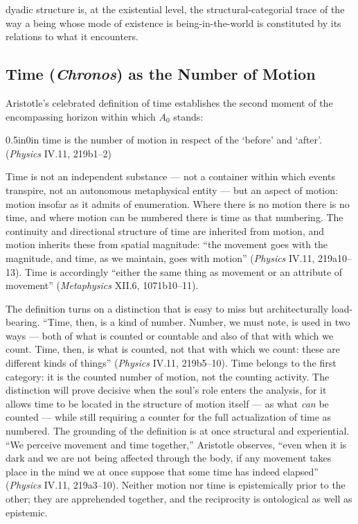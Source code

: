 \documentclass{article}
\begin{document}
dyadic structure is, at the existential level, the structural-categorial trace of the way a being whose mode of existence is being-in-the-world is constituted by its relations to what it encounters.

\subsection{Time (\textit{Chronos}) as the Number of Motion}

Aristotle's celebrated definition of time establishes the second moment of the encompassing horizon within which $A_0$ stands:
\begin{adjustwidth}{0.5in}{0in}
time is the number of motion in respect of the `before' and `after'. (\textit{Physics} IV.11, 219b1--2)
\end{adjustwidth}
Time is not an independent substance --- not a container within which events transpire, not an autonomous metaphysical entity --- but an aspect of motion: motion insofar as it admits of enumeration. Where there is no motion there is no time, and where motion can be numbered there is time as that numbering. The continuity and directional structure of time are inherited from motion, and motion inherits these from spatial magnitude: ``the movement goes with the magnitude, and time, as we maintain, goes with motion'' (\textit{Physics} IV.11, 219a10--13). Time is accordingly ``either the same thing as movement or an attribute of movement'' (\textit{Metaphysics} XII.6, 1071b10--11).

The definition turns on a distinction that is easy to miss but architecturally load-bearing. ``Time, then, is a kind of number. Number, we must note, is used in two ways --- both of what is counted or countable and also of that with which we count. Time, then, is what is counted, not that with which we count: these are different kinds of things'' (\textit{Physics} IV.11, 219b5--10). Time belongs to the first category: it is the counted number of motion, not the counting activity. The distinction will prove decisive when the soul's role enters the analysis, for it allows time to be located in the structure of motion itself --- as what \textit{can} be counted --- while still requiring a counter for the full actualization of time as numbered. The grounding of the definition is at once structural and experiential. ``We perceive movement and time together,'' Aristotle observes, ``even when it is dark and we are not being affected through the body, if any movement takes place in the mind we at once suppose that some time has indeed elapsed'' (\textit{Physics} IV.11, 219a3--10). Neither motion nor time is epistemically prior to the other; they are apprehended together, and the reciprocity is ontological as well as epistemic.
\end{document}
